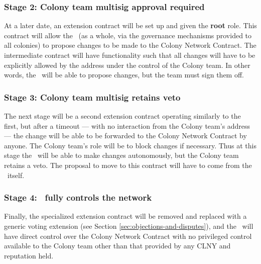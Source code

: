 \subsubsection*{Stage 2: Colony team multisig approval required}
At a later date, an extension contract will be set up and given the \textbf{root} role. This contract will allow the \rc\ (as a whole, via the governance mechanisms provided to all colonies) to propose changes to be made to the Colony Network Contract. The intermediate contract will have functionality such that all changes will have to be explicitly allowed by the address under the control of the Colony team. In other words, the \rc\ will be able to propose changes, but the team must sign them off.

\subsubsection*{Stage 3: Colony team multisig retains veto}
The next stage will be a second extension contract operating similarly to the first, but after a timeout --- with no interaction from the Colony team's address --- the change will be able to be forwarded to the Colony Network Contract by anyone. The Colony team's role will be to block changes if necessary. Thus at this stage the \rc\ will be able to make changes autonomously, but the Colony team retains a veto.  The proposal to move to this contract will have to come from the \rc\ itself.

\subsubsection*{Stage 4: \rc\ fully controls the network}
Finally, the specialized extension contract will be removed and replaced with a generic voting extension (see Section \ref{sec:objections-and-disputes}), and the \rc\ will have direct control over the Colony Network Contract with no privileged control available to the Colony team other than that provided by any CLNY and reputation held.

